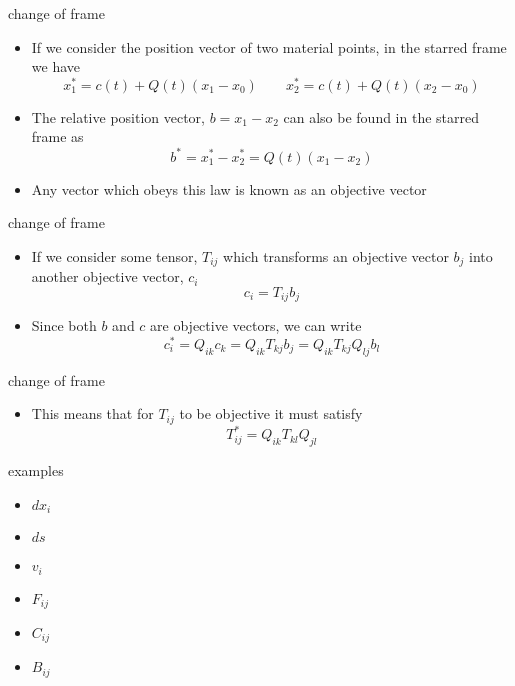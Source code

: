 \documentclass[
  letterpaper,
  ignorenonframetext,
  aspectratio=43,
  handout,
  12pt]{beamer}
\providecommand{\tightlist}{%
  \setlength{\itemsep}{0pt}\setlength{\parskip}{0pt}}
\providecommand{\tightlist}{%
\setlength{\itemsep}{0pt}\setlength{\parskip}{0pt}}
\begin{document}
\begin{frame}{change of frame}
\protect\hypertarget{change-of-frame-3}{}
\begin{itemize}
\item
  If we consider the position vector of two material points, in the
  starred frame we have
  \[x_1^* = c(t) + Q(t)(x_1-x_0) \qquad x_2^* = c(t) + Q(t)(x_2-x_0)\]
\item
  The relative position vector, \(b=x_1-x_2\) can also be found in the
  starred frame as \[b^* = x_1^*-x_2^* = Q(t)(x_1-x_2)\]
\item
  Any vector which obeys this law is known as an objective vector
\end{itemize}
\end{frame}

\begin{frame}{change of frame}
\protect\hypertarget{change-of-frame-4}{}
\begin{itemize}
\item
  If we consider some tensor, \(T_{ij}\) which transforms an objective
  vector \(b_j\) into another objective vector, \(c_i\)
  \[c_i = T_{ij}b_j\]
\item
  Since both \(b\) and \(c\) are objective vectors, we can write
  \[c_i^* = Q_{ik} c_k = Q_{ik} T_{kj} b_j = Q_{ik} T_{kj} Q_{lj} b_l\]
\end{itemize}
\end{frame}

\begin{frame}{change of frame}
\protect\hypertarget{change-of-frame-5}{}
\begin{itemize}
\tightlist
\item
  This means that for \(T_{ij}\) to be objective it must satisfy
  \[T_{ij}^* = Q_{ik} T_{kl} Q_{jl}\]
\end{itemize}
\end{frame}

\begin{frame}{examples}
\protect\hypertarget{examples}{}
\begin{itemize}
\tightlist
\item
  \(dx_i\)
\item
  \(ds\)
\item
  \(v_i\)
\item
  \(F_{ij}\)
\item
  \(C_{ij}\)
\item
  \(B_{ij}\)
\end{itemize}
\end{frame}
\end{document}
